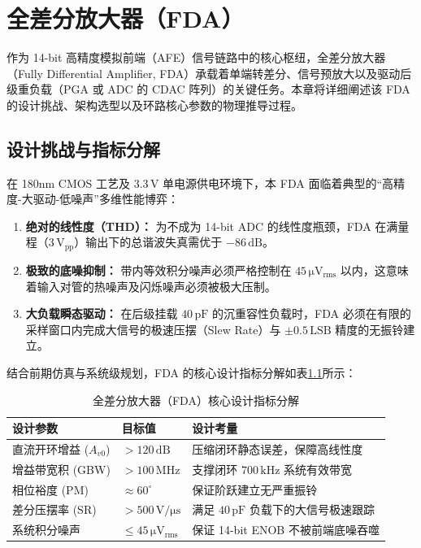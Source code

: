 \chapter{全差分放大器（FDA）}

作为 14-bit 高精度模拟前端（AFE）信号链路中的核心枢纽，全差分放大器（Fully Differential Amplifier, FDA）承载着单端转差分、信号预放大以及驱动后级重负载（PGA 或 ADC 的 CDAC 阵列）的关键任务。本章将详细阐述该 FDA 的设计挑战、架构选型以及环路核心参数的物理推导过程。

\section{设计挑战与指标分解}

在 180nm CMOS 工艺及 $3.3\,\mathrm{V}$ 单电源供电环境下，本 FDA 面临着典型的“高精度-大驱动-低噪声”多维性能博弈：
\begin{enumerate}
    \item \textbf{绝对的线性度（THD）：} 为不成为 14-bit ADC 的线性度瓶颈，FDA 在满量程（$3\,\mathrm{V_{pp}}$）输出下的总谐波失真需优于 $-86\,\mathrm{dB}$。
    \item \textbf{极致的底噪抑制：} 带内等效积分噪声必须严格控制在 $45\,\mathrm{\mu V_{rms}}$ 以内，这意味着输入对管的热噪声及闪烁噪声必须被极大压制。
    \item \textbf{大负载瞬态驱动：} 在后级挂载 $40\,\mathrm{pF}$ 的沉重容性负载时，FDA 必须在有限的采样窗口内完成大信号的极速压摆（Slew Rate）与 $\pm 0.5\,\mathrm{LSB}$ 精度的无振铃建立。
\end{enumerate}

结合前期仿真与系统级规划，FDA 的核心设计指标分解如表\ref{tab:fda_design_specs}所示：
\begin{table}[H]
\centering
\caption{全差分放大器（FDA）核心设计指标分解}
\label{tab:fda_design_specs}
\begin{tabular}{llp{7cm}}
\toprule
\textbf{设计参数} & \textbf{目标值} & \textbf{设计考量} \\
\midrule
直流开环增益 ($A_{v0}$) & $> 120\,\mathrm{dB}$ & 压缩闭环静态误差，保障高线性度 \\
增益带宽积 (GBW) & $> 100\,\mathrm{MHz}$ & 支撑闭环 $700\,\mathrm{kHz}$ 系统有效带宽 \\
相位裕度 (PM) & $\approx 60^\circ$ & 保证阶跃建立无严重振铃 \\
差分压摆率 (SR) & $> 500\,\mathrm{V/\mu s}$ & 满足 $40\,\mathrm{pF}$ 负载下的大信号极速跟踪 \\
系统积分噪声 & $\le 45\,\mathrm{\mu V_{rms}}$ & 保证 14-bit ENOB 不被前端底噪吞噬 \\
\bottomrule
\end{tabular}
\end{table}

